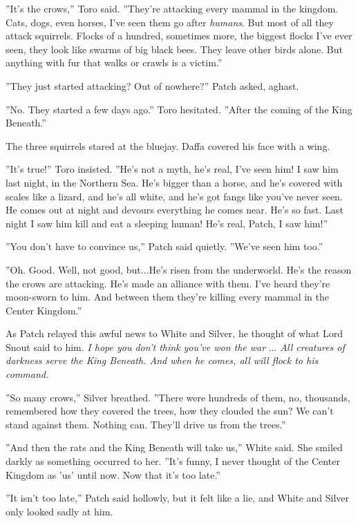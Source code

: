 \documentclass[12pt]{book}
\begin{document}
''It's the crows,'' Toro said. ''They're attacking every mammal in the kingdom. Cats, dogs, even horses, I've seen them go after {\it humans}. But most of all they attack squirrels. Flocks of a hundred, sometimes more, the biggest flocks I've ever seen, they look like swarms of big black bees. They leave other birds alone. But anything with fur that walks or crawls is a victim.''

''They just started attacking? Out of nowhere?'' Patch asked, aghast.

''No. They started a few days ago.'' Toro hesitated. ''After the coming of the King Beneath.''

The three squirrels stared at the bluejay. Daffa covered his face with a wing.

''It's true!'' Toro insisted. ''He's not a myth, he's real, I've seen him! I saw him last night, in the Northern Sea. He's bigger than a horse, and he's covered with scales like a lizard, and he's all white, and he's got fangs like you've never seen. He comes out at night and devours everything he comes near. He's so fast. Last night I saw him kill and eat a sleeping human! He's real, Patch, I saw him!''

''You don't have to convince us,'' Patch said quietly. ''We've seen him too.''

''Oh. Good. Well, not good, but...He's risen from the underworld. He's the reason the crows are attacking. He's made an alliance with them. I've heard they're moon-sworn to him. And between them they're killing every mammal in the Center Kingdom.''

As Patch relayed this awful news to White and Silver, he thought of what Lord Snout said to him. {\it I hope you don't think you've won the war} ... {\it All creatures of darkness serve the King Beneath. And when he comes, all will flock to his command.}

''So many crows,'' Silver breathed. ''There were hundreds of them, no, thousands, remembered how they covered the trees, how they clouded the sun? We can't stand against them. Nothing can. They'll drive us from the trees.''

''And then the rats and the King Beneath will take us,'' White said. She smiled darkly as something occurred to her. ''It's funny, I never thought of the Center Kingdom as 'us' until now. Now that it's too late.''

''It isn't too late,'' Patch said hollowly, but it felt like a lie, and White and Silver only looked sadly at him.
\end{document}
